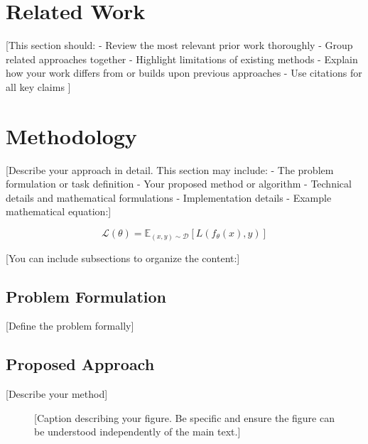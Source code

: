 \documentclass[conference]{IEEEtran}
\begin{document}
\section{Related Work}
[This section should:
- Review the most relevant prior work thoroughly
- Group related approaches together
- Highlight limitations of existing methods
- Explain how your work differs from or builds upon previous approaches
- Use citations for all key claims \cite{author2022method}]

\section{Methodology}
[Describe your approach in detail. This section may include:
- The problem formulation or task definition
- Your proposed method or algorithm
- Technical details and mathematical formulations
- Implementation details
- Example mathematical equation:]

\begin{equation}
    \mathcal{L}(\theta) = \mathbb{E}_{(x,y) \sim \mathcal{D}} [L(f_\theta(x), y)]
\end{equation}

[You can include subsections to organize the content:]

\subsection{Problem Formulation}
[Define the problem formally]

\subsection{Proposed Approach}
[Describe your method]

\begin{figure}[t]
    \centering
    \caption{[Caption describing your figure. Be specific and ensure the figure can be understood independently of the main text.]}
    \label{fig:example}
\end{figure}
\end{document}
